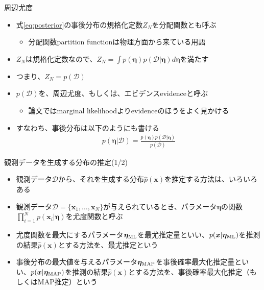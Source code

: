 \documentclass[aspectratio=169,unicode,dvipdfmx,14pt]{beamer}
\begin{document}
\begin{frame}{周辺尤度}
\begin{itemize}
\item 式\eqref{eq:posterior}の事後分布の規格化定数$Z_N$を分配関数とも呼ぶ
\begin{itemize}
\item 分配関数partition functionは物理方面から来ている用語
\end{itemize}
\item $Z_N$は規格化定数なので、$Z_N = \int p(\bm{\eta}) p(\mathcal{D}|\bm{\eta}) d\bm{\eta}$を満たす
\item つまり、$Z_N = p(\mathcal{D})$
\item $p(\mathcal{D})$を、周辺尤度、もしくは、エビデンスevidenceと呼ぶ
\begin{itemize}
\item 論文ではmarginal likelihoodよりevidenceのほうをよく見かける
\end{itemize}
\item すなわち、事後分布は以下のようにも書ける
\begin{align}
p(\bm{\eta} | \mathcal{D}) = \frac{ p(\bm{\eta}) p(\mathcal{D}|\bm{\eta}) }{ p(\mathcal{D}) }
\end{align}
\end{itemize}
\end{frame}

\begin{frame}{観測データを生成する分布の推定(1/2)}
\begin{itemize}
\item 観測データ$\mathcal{D}$から、それを生成する分布$\hat{p}(\bm{x})$を推定する方法は、いろいろある
\item 観測データ$\mathcal{D}=\{\bm{x}_1,\ldots,\bm{x}_N\}$が与えられているとき、パラメータ$\bm{\eta}$の関数$\prod_{i=1}^N p(\bm{x}_i|\bm{\eta})$を尤度関数と呼ぶ
\item[1.] 尤度関数を最大にするパラメータ$\bm{\eta}_{\mbox{\scriptsize ML}}$を最尤推定量といい、$p(\bm{x} | \bm{\eta}_{\mbox{\scriptsize ML}})$を推測の結果$\hat{p}(\bm{x})$とする方法を、最尤推定という
\item[2.] 事後分布の最大値を与えるパラメータ$\bm{\eta}_{\mbox{\scriptsize MAP}}$を事後確率最大化推定量といい、$p(\bm{x} | \bm{\eta}_{\mbox{\scriptsize MAP}})$を推測の結果$\hat{p}(\bm{x})$とする方法を、事後確率最大化推定（もしくはMAP推定）という
\end{itemize}
\end{frame}
\end{document}
